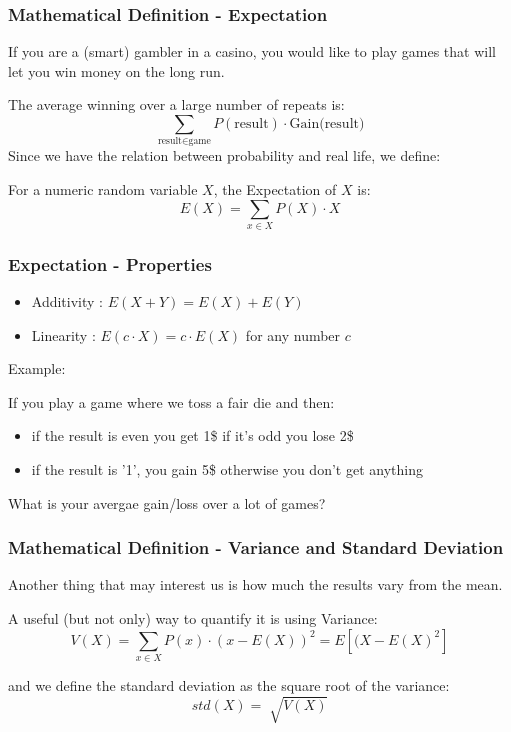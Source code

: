 \documentclass{beamer}
\begin{document}
\begin{frame}
\frametitle{Mathematical Definition - Expectation}
If you are a (smart) gambler in a casino, you would like to play games that will let you win money on the long run.

The average winning over a large number of repeats is:
$$ \sum_{\text{result} \in \text{game}}{P(\text{result}) \cdot \text{Gain}(\text{result}})$$
Since we have the relation between probability and real life, we define:

For a numeric random variable $X$, the Expectation of $X$ is:
$$ E(X)=\sum_{x \in X}{P(X) \cdot X}$$
\end{frame}

\begin{frame}
\frametitle{Expectation - Properties}
\begin{itemize}
\item Additivity : $E(X+Y)=E(X)+E(Y)$
\item Linearity : $E(c \cdot X)=c \cdot E(X)$ for any number $c$
\end{itemize}
Example:

If you play a game where we toss a fair die and then:
\begin{itemize}
\item if the result is even you get 1\$ if it's odd you lose 2\$
\item if the result is '1', you gain 5\$ otherwise you don't get anything
\end{itemize}
What is your avergae gain/loss over a lot of games?
\end{frame}
\begin{frame}
\frametitle{Mathematical Definition - Variance and Standard Deviation}
Another thing that may interest us is how much the results vary from the mean.

A useful (but not only) way to quantify it is using Variance:
$$ V(X)= \sum_{x \in X}{P(x) \cdot (x-E(X))^2} = E[(X-E(X)^2]$$

and we define the standard deviation as the square root of the variance:
$$ std(X)=\sqrt[]{V(X)}$$
\end{frame}
\end{document}

